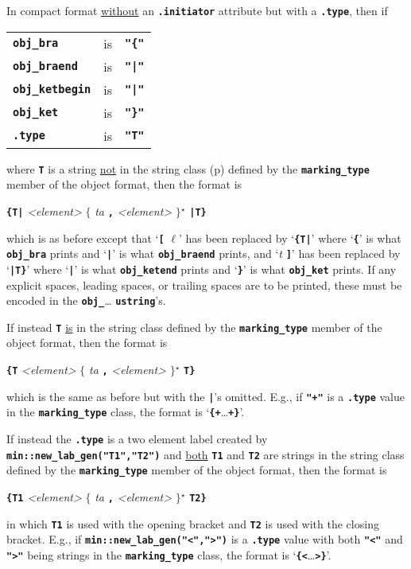 \documentclass[12pt]{article}
\newcommand{\TT}[1]{{\tt \bfseries #1}}
\newcommand{\STAR}{{\Large $^\star$}}
\newcommand{\OPEN}{{$\{$}}
\newcommand{\CLOSE}{{$\}$}}
\newcommand{\pagref}[1]{p\pageref{#1}}
\newcommand{\EOL}{\penalty \exhyphenpenalty}
\begin{document}
In compact format \underline{without} an \TT{.initiator} attribute but
with a \TT{.type}, then if
\begin{center}
\begin{tabular}{lcl}
\TT{obj\_bra}		& is	& \TT{"\{"} \\
\TT{obj\_braend}	& is	& \TT{"|"} \\
\TT{obj\_ketbegin}	& is	& \TT{"|"} \\
\TT{obj\_ket}		& is	& \TT{"\}"} \\
\TT{.type}		& is	& \TT{"T"} \\
\end{tabular}
\end{center}
where \TT{T} is a string \underline{not} in the string
class (\pagref{STRING-CLASSIFIERS})
defined by the \TT{marking\_\EOL type}\label{MARKING_TYPE} member of the object
format, then the format is
\begin{center}
\TT{\{}\TT{T}\TT{|} {\em <element>}
    \OPEN{} {\em ta} \TT{,} \TT{\textvisiblespace} {\em <element>} \CLOSE\STAR{}
    \TT{|}\TT{T}\TT{\}}
\end{center}
which is as before except that `\TT{[} $\ell$' has been replaced
by `\TT{\{T|}' where `\TT{\{}' is what \TT{obj\_\EOL bra} prints and
`\TT{|}' is what \TT{obj\_\EOL braend} prints, and
`{\em t} \TT{]}' has been replaced
by `\TT{|T\}}' where `\TT{|}' is what \TT{obj\_\EOL ketend} prints and
`\TT{\}}' is what \TT{obj\_\EOL ket} prints.
If any explicit
spaces, leading spaces, or trailing spaces
are to be printed, these must be encoded in
the \TT{obj\_}\ldots{} \TT{ustring}'s.

If instead \TT{T} \underline{is} in the string
class defined by the \TT{marking\_\EOL type} member of the object
format, then the format is
\begin{center}
\TT{\{}\TT{T} {\em <element>}
    \OPEN{} {\em ta} \TT{,} \TT{\textvisiblespace} {\em <element>} \CLOSE\STAR{}
    \TT{T}\TT{\}}
\end{center}
which is the same as before but with the \TT{|}'s omitted.
E.g., if \TT{"+"} is a \TT{.type} value in the \TT{marking\_\EOL type} class,
the format is `\TT{\{+}\ldots\TT{+\}}'.

If instead the \TT{.type} is a two element label created by
\TT{min::new\_\EOL lab\_\EOL gen("T1","T2")} and \underline{both}
\TT{T1} and \TT{T2} are strings in the string
class defined by the \TT{marking\_\EOL type} member of the object
format, then the format is
\begin{center}
\TT{\{}\TT{T1} {\em <element>}
    \OPEN{} {\em ta} \TT{,} \TT{\textvisiblespace} {\em <element>} \CLOSE\STAR{}
    \TT{T2}\TT{\}}
\end{center}
in which \TT{T1} is used with the opening bracket and \TT{T2} is used
with the closing bracket.
E.g., if \TT{min::\EOL new\_\EOL lab\_\EOL gen("<",">")} is a \TT{.type}
value with both \TT{"<"} and \TT{">"} being strings in
the \TT{marking\_\EOL type} class,
the format is `\TT{\{<}\ldots\TT{>\}}'.
\end{document}
